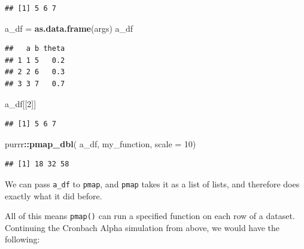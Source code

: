 \documentclass[
]{book}
\newenvironment{Shaded}{\begin{snugshade}}{\end{snugshade}}
\newcommand{\AttributeTok}[1]{\textcolor[rgb]{0.13,0.29,0.53}{#1}}
\newcommand{\DecValTok}[1]{\textcolor[rgb]{0.00,0.00,0.81}{#1}}
\newcommand{\FunctionTok}[1]{\textcolor[rgb]{0.13,0.29,0.53}{\textbf{#1}}}
\newcommand{\NormalTok}[1]{#1}
\newcommand{\OtherTok}[1]{\textcolor[rgb]{0.56,0.35,0.01}{#1}}
\newcommand{\SpecialCharTok}[1]{\textcolor[rgb]{0.81,0.36,0.00}{\textbf{#1}}}
\begin{document}
\begin{verbatim}
## [1] 5 6 7
\end{verbatim}

\begin{Shaded}
\begin{Highlighting}[]
\NormalTok{a\_df }\OtherTok{=} \FunctionTok{as.data.frame}\NormalTok{(args)}
\NormalTok{a\_df}
\end{Highlighting}
\end{Shaded}

\begin{verbatim}
##   a b theta
## 1 1 5   0.2
## 2 2 6   0.3
## 3 3 7   0.7
\end{verbatim}

\begin{Shaded}
\begin{Highlighting}[]
\NormalTok{a\_df[[}\DecValTok{2}\NormalTok{]]}
\end{Highlighting}
\end{Shaded}

\begin{verbatim}
## [1] 5 6 7
\end{verbatim}

\begin{Shaded}
\begin{Highlighting}[]
\NormalTok{purrr}\SpecialCharTok{::}\FunctionTok{pmap\_dbl}\NormalTok{( a\_df, my\_function, }\AttributeTok{scale =} \DecValTok{10}\NormalTok{)}
\end{Highlighting}
\end{Shaded}

\begin{verbatim}
## [1] 18 32 58
\end{verbatim}

We can pass \texttt{a\_df} to \texttt{pmap}, and \texttt{pmap} takes it as a list of lists, and therefore does exactly what it did before.

All of this means \texttt{pmap()} can run a specified function on each row of a dataset.
Continuing the Cronbach Alpha simulation from above, we would have the following:

\begin{Shaded}
\end{Shaded}
\end{document}
